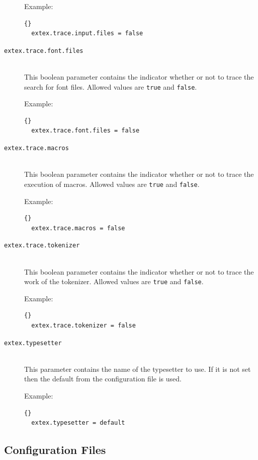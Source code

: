 \documentclass{extex-doc}
\makeatletter
\newcommand\Property[1]{\texttt{#1}\index{#1@\texttt{#1}}}
\makeatother
\begin{document}
\begin{description}
  Example:
\begin{lstlisting}{}
  extex.trace.input.files = false
\end{lstlisting}

\item[\Property{extex.trace.font.files}]\ \\
  This boolean parameter contains the indicator whether or not to
  trace the search for font files.  Allowed values are \verb|true| and
  \verb|false|.

  Example:
\begin{lstlisting}{}
  extex.trace.font.files = false
\end{lstlisting}

\item[\Property{extex.trace.macros}]\ \\
  This boolean parameter contains the indicator whether or not to
  trace the execution of macros.  Allowed values are \verb|true| and
  \verb|false|.

  Example:
\begin{lstlisting}{}
  extex.trace.macros = false
\end{lstlisting}

\item[\Property{extex.trace.tokenizer}]\ \\
  This boolean parameter contains the indicator whether or not to
  trace the work of the tokenizer.  Allowed values are \verb|true| and
  \verb|false|.

  Example:
\begin{lstlisting}{}
  extex.trace.tokenizer = false
\end{lstlisting}

\item[\Property{extex.typesetter}]\ \\
  This parameter contains the name of the typesetter to use. If it is
  not set then the default from the configuration file is used.

  Example:
\begin{lstlisting}{}
  extex.typesetter = default
\end{lstlisting}

\end{description}


\subsection{Configuration Files}
\end{document}

